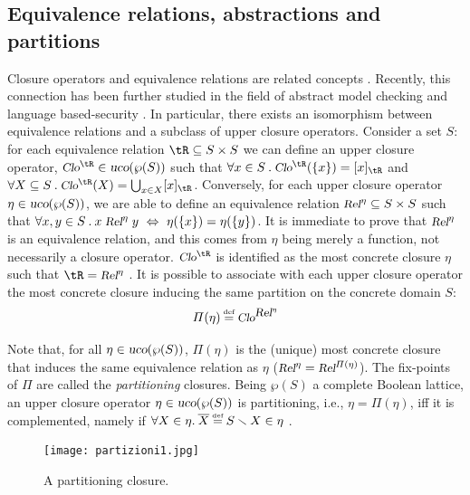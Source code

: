 \documentclass[prodmode,acmtocl]{acmsmall}
\def\ucos{\ensuremath{\mbox{\sl uco}}\xspace}
\newcommand{\Lra}{\Leftrightarrow}
\newcommand{\ov}{\overline}
\def\defi{\mbox{\raisebox{0ex}[1ex][1ex]{$\stackrel{\mbox{\tiny
def}}{\; =\;}$}}}
\newcommand{\0}{\mbox{\bf 0}}
\newcommand{\relc}[1]{\mbox{\sl\small Rel}^{#1}}
\newcommand{\clor}[1]{\mbox{\sl\small Clo}^{#1}}
\begin{document}
\subsection{Equivalence relations, abstractions and partitions}
\label{Sect:partit}

Closure operators and equivalence relations are related concepts
\cite{CC79}.  Recently, this connection has been further studied in
the field of abstract model checking and language based-security
\cite{RT02,HM05}.  In particular, there exists an isomorphism between
equivalence relations and a subclass of upper closure
operators. Consider a set $S$: for each equivalence relation
${\tR}\subseteq S\times S$ we can define an upper closure operator,
$\clor{\tR}\in\ucos(\wp(S))$ such that $\forall x\in
S\:.\:\clor{\tR}(\{x\})=[x]_\tR$ and $\forall X\subseteq
S\:.\:\clor{\tR}(X)=\bigcup_{x\in X}[x]_\tR$.  Conversely, for each
upper closure operator $\eta\in\ucos(\wp(S))$, we are able to define
an equivalence relation $\relc{\eta}\subseteq S\times S$ such that
$\forall x,y\in S\:.\: x \mathrel{\relc{\eta}}
y\ \Lra\ \eta(\{x\})=\eta(\{y\})$.  It is immediate to prove that
$\relc{\eta}$ is an equivalence relation, and this comes from $\eta$
being merely a function, not necessarily a closure operator.
$\clor{\tR}$ is identified as the most concrete closure $\eta$ such
that ${\tR} = \relc{\eta}$ \cite{HM05}.
It is possible to associate with each upper closure operator the most
concrete closure inducing the same partition on the concrete domain
$S$:
\begin{equation}
  \label{partit}
  \Pi(\eta) \defi \clor{\relc{\eta}}
\end{equation}

\noindent
Note that, for all $\eta \in \ucos(\wp(S))$, $\Pi(\eta)$ is the
(unique) most concrete closure that induces the same equivalence
relation as $\eta$ ($\relc{\eta} = \relc{\Pi(\eta)}$).  The fix-points
of $\Pi$ are called the \emph{partitioning} closures.  Being $\wp(S)$
a complete Boolean lattice, an upper closure operator
$\eta\in\ucos(\wp(S))$ is partitioning, i.e., $\eta=\Pi(\eta)$, iff it
is complemented, namely if $\forall X\in\eta.\:\ov{X}\defi
S\smallsetminus X\in\eta$ \cite{HM05}.
  
\begin{figure}[t]  
  \begin{center}  
    \texttt{[image: partizioni1.jpg]}  
    \caption{A partitioning closure.}\label{partizioni}  
  \end{center}  
\end{figure}
\end{document}

